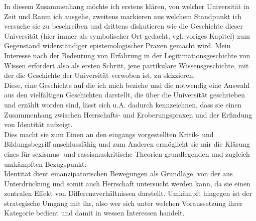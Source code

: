 \noindent In diesem Zusammenhang
möchte ich erstens klären, von welcher Universität in Zeit und Raum ich ausgehe,
zweitens markieren aus welchem Standpunkt ich versuche sie zu beschreiben und
drittens diskutieren wie die Geschichte dieser Universität (hier immer als
symbolischer Ort gedacht, vgl. voriges Kapitel) zum Gegenstand widerständiger
epistemologischer Praxen gemacht wird. Mein Interesse nach der Bedeutung von
Erfahrung in der Legitimationsgeschichte von Wissen erfordert also als ersten
Schritt, jene partikulare Wissensgeschichte,  mit der die Geschichte der
Universität verwoben ist, zu skizzieren.\\

\noindent Diese, eine Geschichte auf die ich mich beziehe und die notwendig eine Auswahl aus den vielfältigen Geschichten
darstellt, die über die Universität geschrieben und erzählt worden sind, lässt
sich u.A. dadurch kennzeichnen, dass sie einen Zusammenhang zwischen
Herrschafts- und Eroberungspraxen und der Erfindung von Identität aufzeigt. \\
Dies
macht sie zum Einen an den eingangs vorgestellten Kritik- und Bildungsbegriff
anschlussfähig und zum Anderen ermöglicht sie mir die Klärung eines für
sexismus- und rassismuskritische Theorien grundlegenden und zugleich umkämpften
Bezugspunkt: \\
Identität dient emanzipatorischen Bewegungen als Grundlage, von der
aus Unterdrückung und somit auch Herrschaft untersucht werden kann, da sie einen
zentralen Effekt von Differenzverhältnissen darstellt. Umkämpft hingegen ist der
strategische Umgang mit ihr, also wer sich unter welchen Voraussetzung ihrer
Kategorie bedient und damit in wessen Interessen handelt.\\ 


